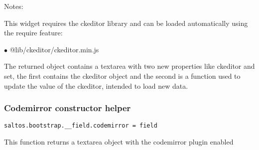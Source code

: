 \documentclass[a4paper]{article}
\begin{document}
Notes:

This widget requires the ckeditor library and can be loaded automatically using the require
feature:

\begin{compactitem}
\item[\color{myblue}$\bullet$] @lib/ckeditor/ckeditor.min.js
\end{compactitem}

The returned object contains a textarea with two new properties like ckeditor and set,
the first contains the ckeditor object and the second is a function used to update the
value of the ckeditor, intended to load new data.

\hypertarget{toc618}{}
\subsubsection{Codemirror constructor helper}

\begin{lstlisting}
saltos.bootstrap.__field.codemirror = field
\end{lstlisting}

This function returns a textarea object with the codemirror plugin enabled
\end{document}
